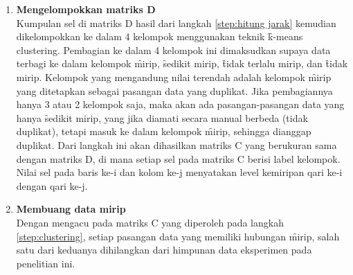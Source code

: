 \begin{enumerate}
  	\item \label{step:clustering} \textbf{Mengelompokkan matriks D}\\
    Kumpulan sel di matriks D hasil dari langkah \ref{step:hitung jarak} kemudian dikelompokkan ke dalam 4 kelompok menggunakan teknik \f{k-means clustering}. Pembagian ke dalam 4 kelompok ini dimaksudkan supaya data terbagi ke dalam kelompok \f{mirip}, \f{sedikit mirip}, \f{tidak terlalu mirip}, dan \f{tidak mirip}. Kelompok yang mengandung nilai terendah adalah kelompok \f{mirip} yang ditetapkan sebagai pasangan data yang duplikat. Jika pembagiannya hanya 3 atau 2 kelompok saja, maka akan ada pasangan-pasangan data yang hanya \f{sedikit mirip}, yang jika diamati secara manual berbeda (tidak duplikat), tetapi masuk ke dalam kelompok \f{mirip}, sehingga dianggap duplikat. Dari langkah ini akan dihasilkan matriks C yang berukuran sama dengan matriks D, di mana setiap sel pada matriks C berisi label kelompok. Nilai sel pada baris ke-i dan kolom ke-j menyatakan level kemiripan qari ke-i dengan qari ke-j.
  	
  	\item \textbf{Membuang data mirip}\\
    Dengan mengacu pada matriks C yang diperoleh pada langkah \ref{step:clustering}, setiap pasangan data yang memiliki hubungan \f{mirip}, salah satu dari keduanya dihilangkan dari himpunan data eksperimen pada penelitian ini.
  \end{enumerate}

